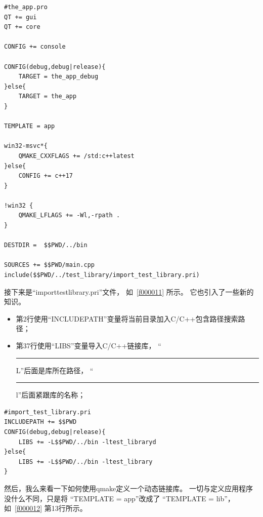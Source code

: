 \begin{lstlisting}[label=f000016,
caption=GoodLuck,
title=\lstlistingname\ \thelstlisting
]
#the_app.pro
QT += gui
QT += core

CONFIG += console

CONFIG(debug,debug|release){
    TARGET = the_app_debug
}else{
    TARGET = the_app
}

TEMPLATE = app

win32-msvc*{
    QMAKE_CXXFLAGS += /std:c++latest
}else{
    CONFIG += c++17
}

!win32 {
    QMAKE_LFLAGS += -Wl,-rpath .
}

DESTDIR =  $$PWD/../bin

SOURCES += $$PWD/main.cpp
include($$PWD/../test_library/import_test_library.pri)
\end{lstlisting}          %


接下来是“import\underline{\hspace{0.5em}}test\underline{\hspace{0.5em}}library.pri”文件，
如\lstlistingname\ \ref{f000011} 所示。
它也引入了一些新的知识。
\begin{itemize}
\item 第2行使用“INCLUDEPATH”变量将当前目录加入C/C{\sourcefonttwo{}+}{\sourcefonttwo{}+}包含路径搜索路径；
\item 第3\raisebox{0.16ex}{\sourcefonttwo\~{}}7行使用“LIBS”变量导入C/C{\sourcefonttwo{}+}{\sourcefonttwo{}+}链接库，
“\hspace{0.05em}\rule[0.7ex]{0.4em}{0.65pt}\hspace{0.05em}L”后面是库所在路径，
“\hspace{0.05em}\rule[0.7ex]{0.4em}{0.65pt}\hspace{0.05em}l”后面紧跟库的名称；
\end{itemize}
\begin{lstlisting}[label=f000011,
caption=GoodLuck,
title=\lstlistingname\ \thelstlisting
]
#import_test_library.pri
INCLUDEPATH += $$PWD
CONFIG(debug,debug|release){
    LIBS += -L$$PWD/../bin -ltest_libraryd
}else{
    LIBS += -L$$PWD/../bin -ltest_library
}
\end{lstlisting}          %


然后，我么来看一下如何使用qmake定义一个动态链接库。
一切与定义应用程序没什么不同，只是将
“TEMPLATE {\sourcefonttwo{}=} app”改成了
“TEMPLATE {\sourcefonttwo{}=} lib”，如\lstlistingname\ \ref{f000012} 第13行所示。

